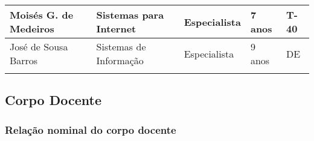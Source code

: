 \begin{table}[h]
\begin{tabular}{lllll}
\multicolumn{1}{|l|}{Moisés G. de Medeiros}     & \multicolumn{1}{l|}{Sistemas para Internet} & \multicolumn{1}{l|}{Especialista}       & \multicolumn{1}{l|}{7 anos}                                                                       & \multicolumn{1}{l|}{T-40}                                                                  \\ \hline
\multicolumn{1}{|l|}{José de Sousa Barros}      & \multicolumn{1}{l|}{Sistemas de Informação} & \multicolumn{1}{l|}{Especialista}       & \multicolumn{1}{l|}{9 anos}                                                                       & \multicolumn{1}{l|}{DE}                                                                    \\ \hline
\multicolumn{5}{l}{\cellcolor[HTML]{9B9B9B}{\color[HTML]{9B9B9B}
}}                                                                                                                                                                                                                                                                     
\end{tabular}
\label{tab:nde}
\end{table}

\subsection{Corpo Docente}

\subsubsection{Rela\c{c}\~ao nominal do corpo docente}


